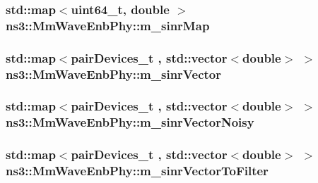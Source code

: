 \subsubsection[{\texorpdfstring{m\+\_\+sinr\+Map}{m_sinrMap}}]{\setlength{\rightskip}{0pt plus 5cm}std\+::map$<$uint64\+\_\+t, double $>$ ns3\+::\+Mm\+Wave\+Enb\+Phy\+::m\+\_\+sinr\+Map\hspace{0.3cm}{\ttfamily [private]}}\hypertarget{classns3_1_1MmWaveEnbPhy_a754de7cf4bdbe107dfb006a5b332842a}{}\label{classns3_1_1MmWaveEnbPhy_a754de7cf4bdbe107dfb006a5b332842a}
\subsubsection[{\texorpdfstring{m\+\_\+sinr\+Vector}{m_sinrVector}}]{\setlength{\rightskip}{0pt plus 5cm}std\+::map$<${\bf pair\+Devices\+\_\+t} , std\+::vector$<$double$>$ $>$ ns3\+::\+Mm\+Wave\+Enb\+Phy\+::m\+\_\+sinr\+Vector\hspace{0.3cm}{\ttfamily [private]}}\hypertarget{classns3_1_1MmWaveEnbPhy_a9e1e37ef62d54fbfc28bfd829e78f239}{}\label{classns3_1_1MmWaveEnbPhy_a9e1e37ef62d54fbfc28bfd829e78f239}
\subsubsection[{\texorpdfstring{m\+\_\+sinr\+Vector\+Noisy}{m_sinrVectorNoisy}}]{\setlength{\rightskip}{0pt plus 5cm}std\+::map$<${\bf pair\+Devices\+\_\+t} , std\+::vector$<$double$>$ $>$ ns3\+::\+Mm\+Wave\+Enb\+Phy\+::m\+\_\+sinr\+Vector\+Noisy\hspace{0.3cm}{\ttfamily [private]}}\hypertarget{classns3_1_1MmWaveEnbPhy_a796cebfd5468736861afc539d2ec4098}{}\label{classns3_1_1MmWaveEnbPhy_a796cebfd5468736861afc539d2ec4098}
\subsubsection[{\texorpdfstring{m\+\_\+sinr\+Vector\+To\+Filter}{m_sinrVectorToFilter}}]{\setlength{\rightskip}{0pt plus 5cm}std\+::map$<${\bf pair\+Devices\+\_\+t} , std\+::vector$<$double$>$ $>$ ns3\+::\+Mm\+Wave\+Enb\+Phy\+::m\+\_\+sinr\+Vector\+To\+Filter\hspace{0.3cm}{\ttfamily [private]}}\hypertarget{classns3_1_1MmWaveEnbPhy_a2887e6ce935c6d25fc2759269b811bbe}{}\label{classns3_1_1MmWaveEnbPhy_a2887e6ce935c6d25fc2759269b811bbe}
